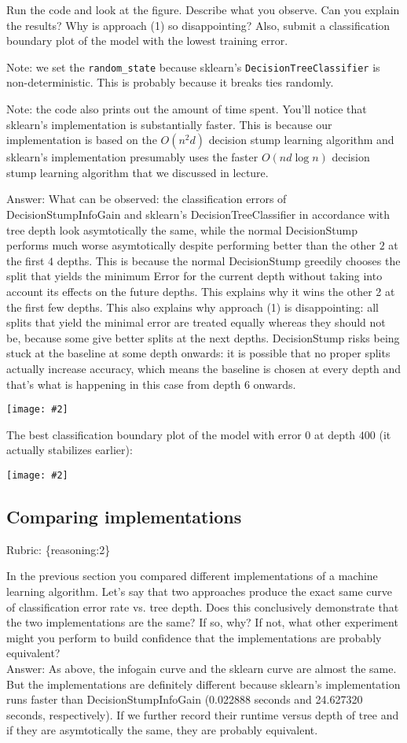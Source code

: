 \documentclass{article}
\def\rubric#1{\gre{Rubric: \{#1\}}}{}
\def\blu#1{{\color{blu}#1}}
\def\gre#1{{\color{gre}#1}}
\newcommand{\centerfig}[2]{\begin{center}\texttt{[image: \#2]}\end{center}}
\def\ans#1{\gre{Answer: #1}}{}
\begin{document}
Run the code and look at the figure.
\blu{Describe what you observe. Can you explain the results?} Why is approach (1) so disappointing? Also, \blu{submit a classification boundary plot of the model with the lowest training error}.

Note: we set the \verb|random_state| because sklearn's \texttt{DecisionTreeClassifier} is non-deterministic. This is probably
because it breaks ties randomly.

Note: the code also prints out the amount of time spent. You'll notice that sklearn's implementation is substantially faster. This is because
our implementation is based on the $O(n^2d)$ decision stump learning algorithm and sklearn's implementation presumably uses the faster $O(nd\log n)$
decision stump learning algorithm that we discussed in lecture.

\ans{What can be observed: the classification errors of DecisionStumpInfoGain and sklearn's DecisionTreeClassifier in accordance with tree depth look asymtotically the same, while the normal DecisionStump performs much worse asymtotically despite performing better than the other $2$ at the first $4$ depths. This is because the normal DecisionStump greedily chooses the split that yields the minimum Error for the current depth without taking into account its effects on the future depths. This explains why it wins the other 2 at the first few depths. This also explains why approach (1) is disappointing: all splits that yield the minimal error are treated equally whereas they should not be, because some give better splits at the next depths. DecisionStump risks being stuck at the baseline at some depth onwards: it is possible that no proper splits actually increase accuracy, which means the baseline is chosen at every depth and that's what is happening in this case from depth $6$ onwards.
\centerfig{0.7}{../figs/q6_5_tree_errors}
The best classification boundary plot of the model with error $0$ at depth $400$ (it actually stabilizes earlier):
\centerfig{0.7}{../figs/q6_5_best_decisionBoundary}}


\subsection{Comparing implementations}
\rubric{reasoning:2}

In the previous section you compared different implementations of a machine learning algorithm. Let's say that two
approaches produce the exact same curve of classification error rate vs. tree depth. Does this conclusively demonstrate
that the two implementations are the same? If so, why? If not, what other experiment might you perform to build confidence
that the implementations are probably equivalent? \\
\ans{As above, the infogain curve and the sklearn curve are almost the same. But the implementations are definitely different because sklearn's implementation runs faster than DecisionStumpInfoGain (0.022888 seconds and 24.627320 seconds, respectively). If we further record their runtime versus depth of tree and if they are asymtotically the same, they are probably equivalent.}
\end{document}
